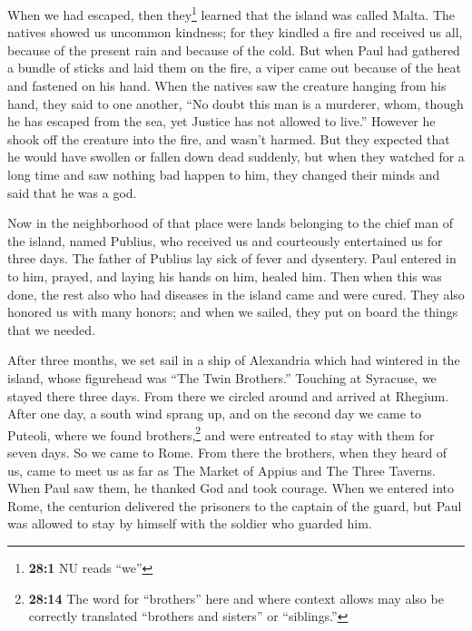 \begin{paracol}{2}
\begin{otherlanguage}{english}
 When we had escaped, then they\footnote{\textbf{28:1} NU
  reads ``we''} learned that the island was called Malta. 
The natives showed us uncommon kindness; for they kindled a fire and
received us all, because of the present rain and because of the cold.
 But when Paul had gathered a bundle of sticks and laid
them on the fire, a viper came out because of the heat and fastened on
his hand.  When the natives saw the creature hanging from
his hand, they said to one another, ``No doubt this man is a murderer,
whom, though he has escaped from the sea, yet Justice has not allowed to
live.''  However he shook off the creature into the fire,
and wasn't harmed.  But they expected that he would have
swollen or fallen down dead suddenly, but when they watched for a long
time and saw nothing bad happen to him, they changed their minds and
said that he was a god.

 Now in the neighborhood of that place were lands
belonging to the chief man of the island, named Publius, who received us
and courteously entertained us for three days.  The father
of Publius lay sick of fever and dysentery. Paul entered in to him,
prayed, and laying his hands on him, healed him.  Then
when this was done, the rest also who had diseases in the island came
and were cured.  They also honored us with many honors;
and when we sailed, they put on board the things that we needed.

 After three months, we set sail in a ship of Alexandria
which had wintered in the island, whose figurehead was ``The Twin
Brothers.''  Touching at Syracuse, we stayed there three
days.  From there we circled around and arrived at
Rhegium. After one day, a south wind sprang up, and on the second day we
came to Puteoli,  where we found brothers,\footnote{\textbf{28:14}
  The word for ``brothers'' here and where context allows may also be
  correctly translated ``brothers and sisters'' or ``siblings.''} and
were entreated to stay with them for seven days. So we came to Rome.
 From there the brothers, when they heard of us, came to
meet us as far as The Market of Appius and The Three Taverns. When Paul
saw them, he thanked God and took courage.  When we
entered into Rome, the centurion delivered the prisoners to the captain
of the guard, but Paul was allowed to stay by himself with the soldier
who guarded him.


\end{otherlanguage}
\end{paracol}
